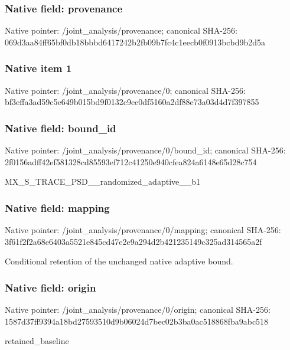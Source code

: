 \documentclass[10pt,a4paper]{article}
\begin{document}
\subsubsection{Native field: provenance}
Native pointer: /joint\_\allowbreak{}analysis/provenance; canonical SHA-256: 069d3aa84ff65bf0db18bbbd6417242b2fb09b7fc4c1eecb0f0913bcbd9b2d5a

\subsubsection{Native item 1}
Native pointer: /joint\_\allowbreak{}analysis/provenance/0; canonical SHA-256: bf3effa3ad59c5e649b015bd9f0132c9ce0df5160a2df88e73a03d4d7f397855

\subsubsection{Native field: bound\_\allowbreak{}id}
Native pointer: /joint\_\allowbreak{}analysis/provenance/0/bound\_\allowbreak{}id; canonical SHA-256: 2f0156adff42ef581328cd85593ef712c41250e940cfea824a6148e65d28c754

\begingroup\raggedright\sloppy MX\_\allowbreak{}S\_\allowbreak{}TRACE\_\allowbreak{}PSD\_\allowbreak{}\_\allowbreak{}randomized\_\allowbreak{}adaptive\_\allowbreak{}\_\allowbreak{}b1\par\endgroup

\subsubsection{Native field: mapping}
Native pointer: /joint\_\allowbreak{}analysis/provenance/0/mapping; canonical SHA-256: 3f61f2f2a68e6403a5521e845cd47e2e9a294d2b421235149c325ad314565a2f

\begingroup\raggedright\sloppy Conditional retention of the unchanged native adaptive bound.\par\endgroup

\subsubsection{Native field: origin}
Native pointer: /joint\_\allowbreak{}analysis/provenance/0/origin; canonical SHA-256: 1587d37ff9394a18bd27593510d9b06024d7bec02b3ba0ac518868fba9abc518

\begingroup\raggedright\sloppy retained\_\allowbreak{}baseline\par\endgroup
\end{document}
